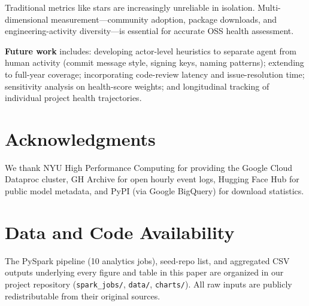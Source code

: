 \documentclass[11pt,twocolumn]{article}
\begin{document}
Traditional metrics like stars are increasingly unreliable in isolation.
Multi-dimensional measurement---community adoption, package downloads, and engineering-activity diversity---is essential for accurate OSS health assessment.

\textbf{Future work} includes: developing actor-level heuristics to separate agent from human activity (commit message style, signing keys, naming patterns); extending to full-year coverage; incorporating code-review latency and issue-resolution time; sensitivity analysis on health-score weights; and longitudinal tracking of individual project health trajectories.

\section*{Acknowledgments}

We thank NYU High Performance Computing for providing the Google Cloud Dataproc cluster, GH Archive for open hourly event logs, Hugging Face Hub for public model metadata, and PyPI (via Google BigQuery) for download statistics.

\section*{Data and Code Availability}

The PySpark pipeline (10 analytics jobs), seed-repo list, and aggregated CSV outputs underlying every figure and table in this paper are organized in our project repository (\texttt{spark\_jobs/}, \texttt{data/}, \texttt{charts/}). All raw inputs are publicly redistributable from their original sources.



\end{document}
